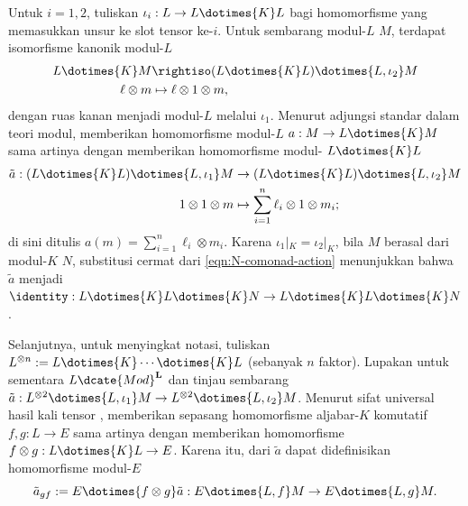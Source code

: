 Untuk $i=1,2$, tuliskan $\iota_i:L\to L\dotimes{K}L$ bagi homomorfisme yang
memasukkan unsur ke slot tensor ke-$i$. Untuk sembarang modul-$L$ $M$,
terdapat isomorfisme kanonik modul-$L$
\begin{align*}
	L \dotimes{K} M & \rightiso (L \dotimes{K} L) \dotimes{L, \iota_2} M \\
	\ell \otimes m & \mapsto \ell \otimes 1 \otimes m,
\end{align*}
dengan ruas kanan menjadi modul-$L$ melalui $\iota_1$. Menurut adjungsi
standar dalam teori modul, memberikan homomorfisme modul-$L$
$a:M\to L\dotimes{K}M$ sama artinya dengan memberikan homomorfisme modul-
$L\dotimes{K}L$
\begin{equation}\label{eqn:flat-descent-map-aux}\begin{aligned}
		\tilde{a}: (L \dotimes{K} L) \dotimes{L, \iota_1} M & \to (L \dotimes{K} L) \dotimes{L, \iota_2} M \\
		1 \otimes 1 \otimes m & \mapsto \sum_{i=1}^n \ell_i \otimes 1 \otimes m_i ;
\end{aligned}\end{equation}
di sini ditulis $a(m)=\sum_{i=1}^n\ell_i\otimes m_i$. Karena
$\iota_1|_K=\iota_2|_K$, bila $M$ berasal dari modul-$K$ $N$, substitusi
cermat dari \eqref{eqn:N-comonad-action} menunjukkan bahwa $\tilde a$
menjadi
$\identity:L\dotimes{K}L\dotimes{K}N\to L\dotimes{K}L\dotimes{K}N$.

Selanjutnya, untuk menyingkat notasi, tuliskan
$L^{\otimes n}:=L\dotimes{K}\cdots\dotimes{K}L$ (sebanyak $n$ faktor).
Lupakan untuk sementara $L\dcate{Mod}^{\mathbf{L}}$ dan tinjau sembarang
$\tilde a:L^{\otimes2}\dotimes{L,\iota_1}M\to
L^{\otimes2}\dotimes{L,\iota_2}M$. Menurut sifat universal hasil kali tensor
\cite[Proposisi 7.3.4]{Li1}, memberikan sepasang homomorfisme aljabar-$K$
komutatif $f,g:L\to E$ sama artinya dengan memberikan homomorfisme
$f\otimes g:L\dotimes{K}L\to E$. Karena itu, dari $\tilde a$ dapat
didefinisikan homomorfisme modul-$E$
\begin{equation*}
	\tilde{a}_{gf} := E \dotimes{f \otimes g} \tilde{a}: E \dotimes{L, f} M \to E \dotimes{L, g} M.
\end{equation*}

